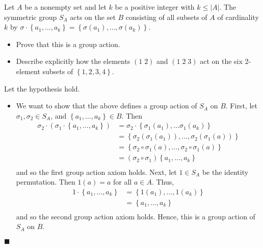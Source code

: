 \documentclass[12pt]{article}
\renewcommand{\qed}{\hfill$\blacksquare$}
\renewenvironment{proof}{\begin{addmargin}[1em]{0em}\begin{newproof}}{\end{newproof}\end{addmargin}\qed}
\newenvironment{problem}[2][Exercise]{\begin{trivlist}
\item[\hskip \labelsep {\bfseries #1}\hskip \labelsep {\bfseries #2.}]}{\end{trivlist}}
\begin{document}
\begin{problem}{1.7.8}
Let $A$ be a nonempty set and let $k$ be a positive integer with $k\leq \left|A\right|$. The symmetric group $S_A$ acts on the set $B$ consisting of all subsets of $A$ of cardinality $k$ by $\sigma \cdot \left\{a_1,\ldots,a_k\right\} = \left\{\sigma\left(a_1\right),\ldots, \sigma\left(a_k\right)\right\}$.
\begin{itemize}
    \item Prove that this is a group action.
    \item Describe explicitly how the elements $\left(1\;2\right)$ and $\left(1\;2\;3\right)$ act on the six 2-element subsets of $\left\{1,2,3,4\right\}$.
\end{itemize}
\end{problem}
\begin{proof}
Let the hypothesis hold.
\begin{itemize}
    \item We want to show that the above defines a group action of $S_A$ on $B$. First, let $\sigma_1, \sigma_2\in S_A$, and $\left\{a_1,\ldots,a_k\right\}\in B$. Then
    \begin{equation*}
        \begin{split}
            \sigma_2 \cdot \left(\sigma_1 \cdot  \left\{a_1,\ldots,a_k\right\} \right) & = \sigma_2 \cdot \left\{\sigma_1\left(a_1\right),\ldots \sigma_1\left(a_k\right)\right\} \\
            & = \left\{ \sigma_2\left(\sigma_1\left(a_1\right)\right),\ldots, \sigma_2\left(\sigma_1\left(a\right)\right)\right\} \\
            & = \left\{ \sigma_2 \circ \sigma_1 \left(a\right),\ldots, \sigma_2 \circ \sigma_1 \left(a\right) \right\} \\
            & = \left(\sigma_2 \circ \sigma_1\right)\left\{a_1,\ldots,a_k\right\} \\
        \end{split}
    \end{equation*}
    and so the first group action axiom holds. Next, let $1\in S_A$ be the identity permutation. Then $1\left(a\right) = a$ for all $a\in A$. Thus,
    \begin{equation*}
        \begin{split}
            1\cdot \left\{a_1,\ldots,a_k\right\} & = \left\{1\left(a_1\right),\ldots,1\left(a_k\right)\right\} \\
            & = \left\{a_1,\ldots,a_k\right\} \\
        \end{split}
    \end{equation*}
    and so the second group action axiom holds. Hence, this is a group action of $S_A$ on $B$.


\end{itemize}
\end{proof}
\end{document}
